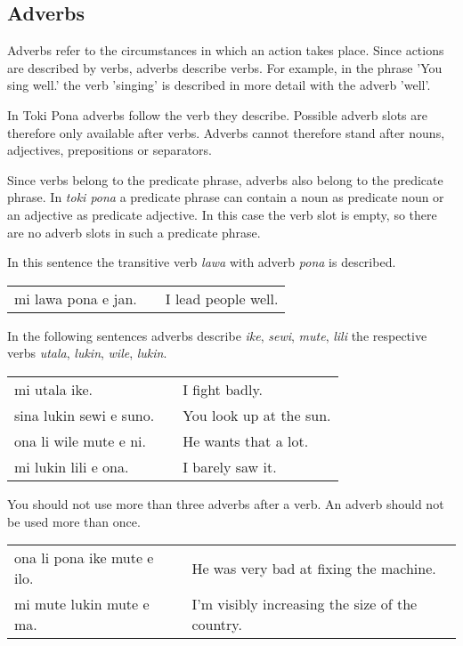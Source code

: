 \newpage{}
%
\subsection*{Adverbs}
%

Adverbs refer to the circumstances in which an action takes place. 
Since actions are described by verbs, adverbs describe verbs. 
For example, in the phrase 'You sing well.' the verb 'singing' is described in more detail with the adverb 'well'. 

In Toki Pona adverbs follow the verb they describe. 
Possible adverb slots are therefore only available after verbs.
Adverbs cannot therefore stand after nouns, adjectives, prepositions or separators. 

Since verbs belong to the predicate phrase, adverbs also belong to the predicate phrase.
In \textit{toki pona} a predicate phrase can contain a noun as predicate noun or an adjective as predicate adjective. 
In this case the verb slot is empty, so there are no adverb slots in such a predicate phrase. 

In this sentence the transitive verb \textit{lawa} with adverb \textit{pona} is described. 

\begin{supertabular}{p{5,5cm}|ll}
mi lawa pona e jan. && I lead people well. \\
\end{supertabular} 

In the following sentences adverbs describe \textit{ike}, \textit{sewi}, \textit{mute}, \textit{lili} the respective verbs \textit{utala}, \textit{lukin}, \textit{wile}, \textit{lukin}.

\begin{supertabular}{p{5,5cm}|ll}
mi utala ike. && I fight badly. \\
sina lukin sewi e suno. && You look up at the sun. \\
ona li wile mute e ni. && He wants that a lot. \\
mi lukin lili e ona. && I barely saw it. \\
\end{supertabular} 

You should not use more than three adverbs after a verb. 
An adverb should not be used more than once. 

\begin{supertabular}{p{5,5cm}|ll}
ona li pona ike mute e ilo. && He was very bad at fixing the machine. \\
mi mute lukin mute e ma. && I'm visibly increasing the size of the country. \\
\end{supertabular}

